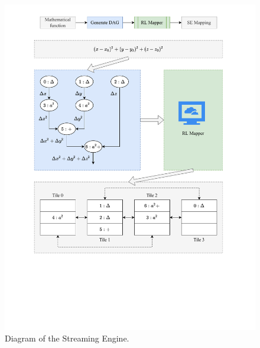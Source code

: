 \begin{figure}
    \centering
    \includegraphics[trim=70 180 70 25, clip, width=\linewidth]{fig/SE_example.pdf}
    \caption{
      Diagram of the Streaming Engine.
    }
    \label{fig:se_example}
  \end{figure}